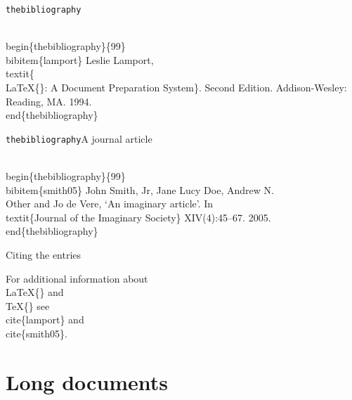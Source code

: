 \begin{frame}[fragile]{\texttt{thebibliography}}
\begin{example}
\begin{semiverbatim}
\alert<1>{\\begin\{thebibliography\}\{99\}}
	\alert<2>{\\bibitem\{lamport\}}\alert<3>{
	  Leslie Lamport, \\textit\{\\LaTeX\{\}: A Document
	  Preparation System\}. Second Edition. Addison-Wesley:
	  Reading, MA. 1994.}
\alert<1>{\\end\{thebibliography\}}
\end{semiverbatim}
\end{example}
\end{frame}

\begin{frame}[fragile]{\texttt{thebibliography}}{A journal article}

\begin{example}
\begin{semiverbatim}
\\begin\{thebibliography\}\{99\}
	\alert<1>{\\bibitem\{smith05\}}\alert<2>{
	  John Smith, Jr, Jane Lucy Doe, Andrew N.\\ Other and
	  Jo de Vere, `An imaginary article'. In
	  \\textit\{Journal of the Imaginary Society\}
	  XIV(4):45--67. 2005.}
\\end\{thebibliography\}
\end{semiverbatim}
\end{example}

\end{frame}

\begin{frame}[fragile]{Citing the entries}
  \begin{example}
	\begin{semiverbatim}
	  For additional information about \\LaTeX\{\} and \\TeX\{\} see
	  \\cite\{lamport\} and \\cite\{smith05\}.
	\end{semiverbatim}
  \end{example}
\end{frame}

\section{Long documents}

